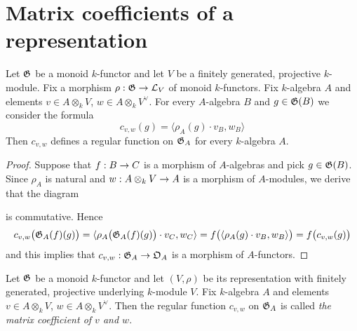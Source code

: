 \section{Matrix coefficients of a representation}

\begin{proposition}\label{proposition:matrix_coefficients}
Let ${\mathfrak G}$ be a monoid $k$-functor and let $V$ be a finitely generated, projective $k$-module. Fix a morphism $\rho:{\mathfrak G} \rightarrow {\mathcal L}_V$ of monoid $k$-functors. Fix $k$-algebra $A$ and elements $v\in A\otimes_kV$, $w\in A\otimes_kV^{\vee}$. For every $A$-algebra $B$ and $g\in {\mathfrak G}(B)$ we consider the formula
$$c_{v,w}(g) = \langle \rho_A(g) \cdot v_B, w_B \rangle$$
Then $c_{v,w}$ defines a regular function on ${\mathfrak G}_A$ for every $k$-algebra $A$.
\end{proposition}
\begin{proof}
Suppose that $f:B\rightarrow C$ is a morphism of $A$-algebras and pick $g\in {\mathfrak G}(B)$. Since $\rho_A$ is natural and $w:A\otimes_kV\rightarrow A$ is a morphism of $A$-modules, we derive that the diagram
\begin{center}
\end{center}
is commutative. Hence 
$$c_{v,w}\big({\mathfrak G}_A(f)(g)\big)=\langle \rho_A\big({\mathfrak G}_A(f)(g)\big)\cdot v_C,w_C\rangle=f\big(\langle \rho_A(g)\cdot v_B, w_B\rangle \big)=f\big(c_{v,w}(g)\big)$$
and this implies that $c_{v,w}:{\mathfrak G}_A\rightarrow {\mathfrak O}_A$ is a morphism of $A$-functors.
\end{proof}

\begin{definition}
Let ${\mathfrak G}$ be a monoid $k$-functor and let $(V,\rho)$ be its representation with finitely generated, projective underlying $k$-module $V$. Fix $k$-algebra $A$ and elements $v\in A\otimes_kV$, $w\in A\otimes_kV^{\vee}$. Then the regular function $c_{v,w}$ on ${\mathfrak G}_A$ is called \textit{the matrix coefficient of $v$ and $w$}.
\end{definition}

